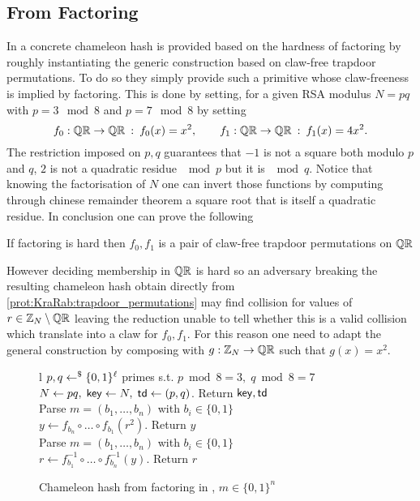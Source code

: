\subsection{From Factoring}
In \cite{NDSS:KraRab00} a concrete chameleon hash is provided based on the hardness of factoring by roughly instantiating the generic construction based on claw-free trapdoor permutations.
To do so they simply provide such a primitive whose claw-freeness is implied by factoring.
This is done by setting, for a given RSA modulus $N = pq$ with $p = 3 \mod 8$ and $p = 7 \mod 8$ by setting
\[	
	f_0 : \mathbb{Q}\mathbb{R} \to \mathbb{Q}\mathbb{R}
		\: : \:
	f_0(x) = x^2,
		\qquad
	f_1 : \mathbb{Q}\mathbb{R} \to \mathbb{Q}\mathbb{R}
		\: : \:
	f_1(x) = 4 x^2.
\]
The restriction imposed on $p, q$ guarantees that $-1$ is not a square both modulo $p$ and $q$, $2$ is not a quadratic residue $\mod p$ but it is $\mod q$.
Notice that knowing the factorisation of $N$ one can invert those functions by computing through chinese remainder theorem a square root that is itself a quadratic residue.
In conclusion one can prove the following

\begin{proposition}
	If factoring is hard then $f_0, f_1$ is a pair of claw-free trapdoor permutations on $\mathbb{Q}\mathbb{R}$
\end{proposition}

However deciding membership in $\mathbb{Q}\mathbb{R}$ is hard so an adversary breaking the resulting chameleon hash obtain directly from \ref{prot:KraRab:trapdoor_permutations} may find collision for values of $r \in \mathbb{Z}_N \setminus \mathbb{Q}\mathbb{R}$ leaving the reduction unable to tell whether this is a valid collision which translate into a claw for $f_0, f_1$.
For this reason one need to adapt the general construction by composing with $g : \mathbb{Z}_N \to \mathbb{Q}\mathbb{R}$ such that $g(x) = x^2$.

\begin{figure}[htb]
\centering
\begin{pcarray}{l}
		{
			$p, q \gets^{\$} \{0, 1\}^\ell$ primes s.t. $p \bmod 8 = 3, \; q \bmod 8 = 7$
				\\
			$N \gets pq, \; \mathsf{key} \gets N, \; \mathsf{td} \gets (p, q)$. Return $\mathsf{key}, \mathsf{td}$
		}
		\\
		{
			Parse $m = (b_1, \ldots, b_n)$ with $b_i \in \{0, 1\}$
				\\
			$y \gets f_{b_n} \circ \ldots \circ f_{b_1} (r^2)$. Return $y$
		}
		\\
		{
			Parse $m = (b_1, \ldots, b_n)$ with $b_i \in \{0, 1\}$
				\\
			$r \gets f_{b_1}^{-1} \circ \ldots \circ f_{b_n}^{-1}(y)$. Return $r$
		}
\end{pcarray}
\caption{Chameleon hash from factoring in \cite{NDSS:KraRab00}, $m \in \{0, 1\}^n$}
\label{prot:KraRab:factoring}
\end{figure}

